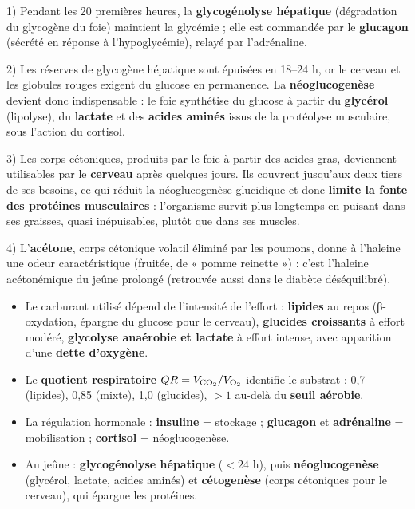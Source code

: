 \documentclass[11pt]{article}
\begin{document}
\begin{corrige}
1) Pendant les 20 premières heures, la \textbf{glycogénolyse hépatique} (dégradation du glycogène du foie) maintient la glycémie ; elle est commandée par le \textbf{glucagon} (sécrété en réponse à l'hypoglycémie), relayé par l'adrénaline.

2) Les réserves de glycogène hépatique sont épuisées en 18--24 h, or le cerveau et les globules rouges exigent du glucose en permanence. La \textbf{néoglucogenèse} devient donc indispensable : le foie synthétise du glucose à partir du \textbf{glycérol} (lipolyse), du \textbf{lactate} et des \textbf{acides aminés} issus de la protéolyse musculaire, sous l'action du cortisol.

3) Les corps cétoniques, produits par le foie à partir des acides gras, deviennent utilisables par le \textbf{cerveau} après quelques jours. Ils couvrent jusqu'aux deux tiers de ses besoins, ce qui réduit la néoglucogenèse glucidique et donc \textbf{limite la fonte des protéines musculaires} : l'organisme survit plus longtemps en puisant dans ses graisses, quasi inépuisables, plutôt que dans ses muscles.

4) L'\textbf{acétone}, corps cétonique volatil éliminé par les poumons, donne à l'haleine une odeur caractéristique (fruitée, de « pomme reinette ») : c'est l'haleine acétonémique du jeûne prolongé (retrouvée aussi dans le diabète déséquilibré).
\end{corrige}

\begin{aretenir}
\begin{itemize}
\item Le carburant utilisé dépend de l'intensité de l'effort : \textbf{lipides} au repos (β-oxydation, épargne du glucose pour le cerveau), \textbf{glucides croissants} à effort modéré, \textbf{glycolyse anaérobie et lactate} à effort intense, avec apparition d'une \textbf{dette d'oxygène}.
\item Le \textbf{quotient respiratoire} $QR = V_{\ce{CO2}}/V_{\ce{O2}}$ identifie le substrat : 0,7 (lipides), 0,85 (mixte), 1,0 (glucides), $> 1$ au-delà du \textbf{seuil aérobie}.
\item La régulation hormonale : \textbf{insuline} = stockage ; \textbf{glucagon} et \textbf{adrénaline} = mobilisation ; \textbf{cortisol} = néoglucogenèse.
\item Au jeûne : \textbf{glycogénolyse hépatique} ($< 24$ h), puis \textbf{néoglucogenèse} (glycérol, lactate, acides aminés) et \textbf{cétogenèse} (corps cétoniques pour le cerveau), qui épargne les protéines.
\end{itemize}
\end{aretenir}
\end{document}
